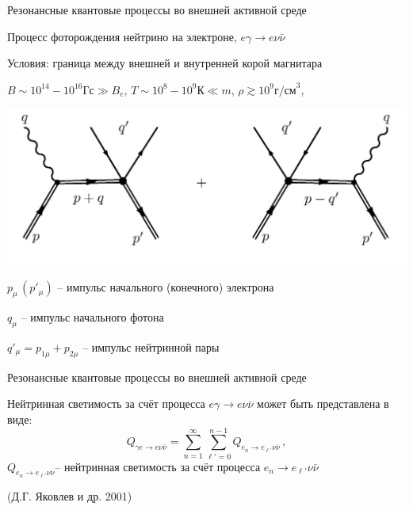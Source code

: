 \documentclass{beamer}
\begin{document}
\begin{frame}{Резонансные квантовые процессы во внешней активной среде}
\begin{center}
Процесс фоторождения нейтрино на электроне, \alert{$e\gamma\to e\nu\bar\nu$}

\alert{Условия:} граница между внешней и внутренней корой магнитара

$B\sim 10^{14}-10^{16} \text{Гс}\gg B_e$, $T\sim 10^8-10^9 \text{К}\ll m$, $\rho\gtrsim 10^9 \text{г/см}^3$, %

\includegraphics[scale=0.1]{fig00.jpg}

$p_\mu\, (p'_\mu)$ -- импульс начального (конечного) электрона

$q_\mu$ -- импульс начального фотона

$q'_\mu = p_{1\mu}+p_{2\mu}$ -- импульс нейтринной пары
\end{center}
\end{frame}
\begin{frame}{Резонансные квантовые процессы во внешней активной среде}
\begin{center}
Нейтринная светимость за счёт процесса $e\gamma\to e\nu\bar\nu$ может быть представлена в виде:
\alert{$$Q_{\gamma e \to e \nu \bar \nu} = \sum\limits_{n=1}^{\infty}
\sum\limits_{\ell'=0}^{n-1}  
Q_{e_n \to e_{\ell'} \nu \bar \nu}  \, ,$$}
$Q_{e_n \to e_{\ell'} \nu \bar \nu}$-- нейтринная светимость за счёт процесса $e_n\to e_{\ell'}\nu\bar\nu$

(Д.Г. Яковлев и др. 2001)
\end{center}
\end{frame}
\end{document}
